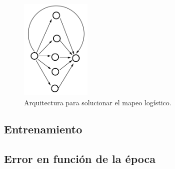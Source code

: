 \begin{figure}[H]
	\centering
	\includegraphics[width=0.3\textwidth]{ejer_3.png}
	\caption{Arquitectura para solucionar el mapeo logístico.}
	\label{fig:arq-mapeo}
\end{figure}

\subsection*{Entrenamiento}

\subsection*{Error en función de la época}



